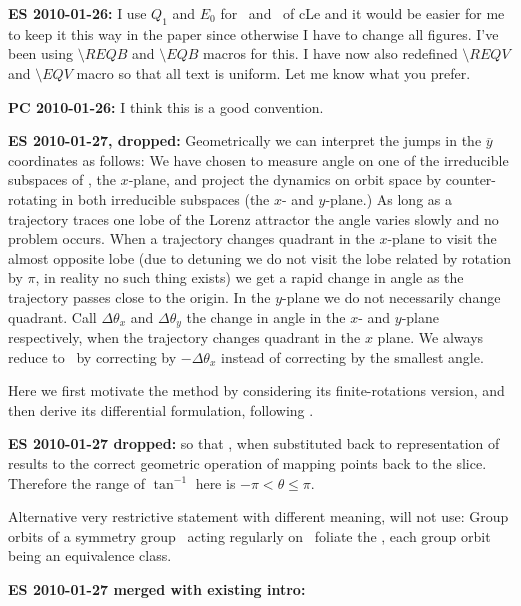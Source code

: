 {\bf ES 2010-01-26:}
I use $Q_1$ and $E_0$ for \reqv\ and \eqv\ of cLe and it
would be easier for me to keep it this way in the paper since
otherwise I have to change all figures. I've been using
$\setminus REQB$ and $\setminus EQB$ macros for this. I have
now also redefined $\setminus REQV$ and $\setminus EQV$ macro
so that all text is uniform. Let me know what you prefer.

{\bf PC 2010-01-26:} I think this is a good convention.

{\bf ES 2010-01-27, dropped:}
Geometrically we can interpret the jumps in the
$\overline{y}$ coordinates as follows: We have chosen to
measure angle on one of the irreducible subspaces of ,
the $x$-plane, and project the dynamics on orbit space by
counter-rotating in both irreducible subspaces (the $x$- and
$y$-plane.) As long as a trajectory traces one lobe of the
Lorenz attractor the angle varies slowly and no problem
occurs. When a trajectory changes quadrant in the $x$-plane
to visit the almost opposite lobe (due to detuning we do not
visit the lobe related by rotation by $\pi$, in reality no
such thing exists) we get a rapid change in angle as the
trajectory passes close to the origin. In the $y$-plane we do
not necessarily change quadrant. Call $\Delta \theta_x$ and
$\Delta\theta_y$ the change in angle in the $x$- and
$y$-plane respectively, when the trajectory changes quadrant
in the $x$ plane. We always reduce to \reducedsp\ by
correcting by $-\Delta\theta_x$ instead of correcting by the
smallest angle.

Here we
first motivate the method by considering its
finite-rotations version, and then derive its differential
formulation, following .

{\bf ES 2010-01-27 dropped:}
so that , when substituted back to
representation  of  results to the
correct geometric operation of mapping points back to the
slice. Therefore the range of $\tan^{-1}$ here is
$-\pi<\theta\leq\pi$.

Alternative very restrictive statement with different meaning, will not use: Group orbits
of a symmetry group \Group\ acting regularly
on \pS\ foliate the \statesp, each group orbit being
an equivalence class.

{\bf ES 2010-01-27 merged with existing intro:}

